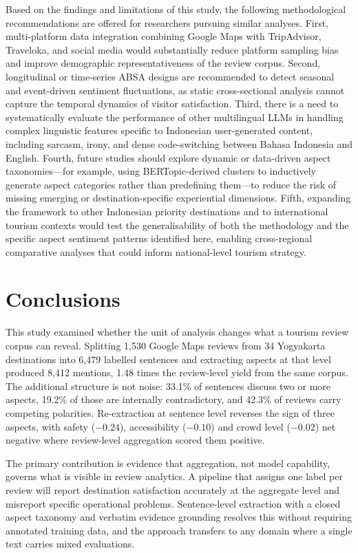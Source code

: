 \documentclass[pdflatex,sn-mathphys-num]{sn-jnl}
\begin{document}
Based on the findings and limitations of this study, the following methodological recommendations are offered for researchers pursuing similar analyses. First, multi-platform data integration combining Google Maps with TripAdvisor, Traveloka, and social media would substantially reduce platform sampling bias and improve demographic representativeness of the review corpus. Second, longitudinal or time-series ABSA designs are recommended to detect seasonal and event-driven sentiment fluctuations, as static cross-sectional analysis cannot capture the temporal dynamics of visitor satisfaction. Third, there is a need to systematically evaluate the performance of other multilingual LLMs in handling complex linguistic features specific to Indonesian user-generated content, including sarcasm, irony, and dense code-switching between Bahasa Indonesia and English. Fourth, future studies should explore dynamic or data-driven aspect taxonomies---for example, using BERTopic-derived clusters to inductively generate aspect categories rather than predefining them---to reduce the risk of missing emerging or destination-specific experiential dimensions. Fifth, expanding the framework to other Indonesian priority destinations and to international tourism contexts would test the generalisability of both the methodology and the specific aspect sentiment patterns identified here, enabling cross-regional comparative analyses that could inform national-level tourism strategy.

\section{Conclusions}\label{sec6}

This study examined whether the unit of analysis changes what a tourism review corpus can reveal. Splitting 1,530 Google Maps reviews from 34 Yogyakarta destinations into 6,479 labelled sentences and extracting aspects at that level produced 8,412 mentions, 1.48 times the review-level yield from the same corpus. The additional structure is not noise: 33.1\% of sentences discuss two or more aspects, 19.2\% of those are internally contradictory, and 42.3\% of reviews carry competing polarities. Re-extraction at sentence level reverses the sign of three aspects, with safety ($-0.24$), accessibility ($-0.10$) and crowd level ($-0.02$) net negative where review-level aggregation scored them positive.

The primary contribution is evidence that aggregation, not model capability, governs what is visible in review analytics. A pipeline that assigns one label per review will report destination satisfaction accurately at the aggregate level and misreport specific operational problems. Sentence-level extraction with a closed aspect taxonomy and verbatim evidence grounding resolves this without requiring annotated training data, and the approach transfers to any domain where a single text carries mixed evaluations.
\end{document}
